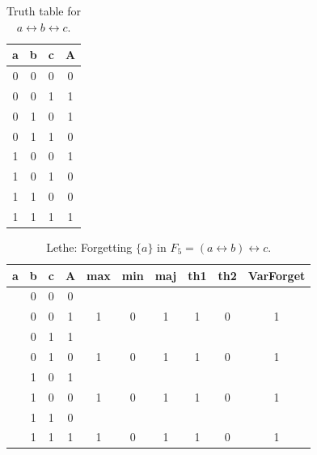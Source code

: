 \begin{table}[!tb]
    \centering
    \begin{tabular}{|c|c|c|c|}
        \hline
        \textbf{a} & \textbf{b} & \textbf{c} & \textbf{A} \\ \hline
        0 & 0 & 0 & 0 \\ \hline
        0 & 0 & 1 & 1 \\ \hline
        0 & 1 & 0 & 1 \\ \hline
        0 & 1 & 1 & 0 \\ \hline
        1 & 0 & 0 & 1 \\ \hline
        1 & 0 & 1 & 0 \\ \hline
        1 & 1 & 0 & 0 \\ \hline
        1 & 1 & 1 & 1 \\ \hline
    \end{tabular}
    \caption{Truth table for $a \leftrightarrow b \leftrightarrow c$.}
    \label{tab:truthtab}
\end{table}

\begin{table}[!tb]
    \centering
    \begin{tabular}{|c|c|c|c|c|c|c|c|c|c|}
        \hline
        \textbf{a} & \textbf{b} & \textbf{c} & \textbf{A} & \textbf{max} & \textbf{min} & \textbf{maj} & \textbf{th1} & \textbf{th2} & \textbf{VarForget} \\ \hline
        \rowcolor{gray!40}  & 0 & 0 & 0 &  &  &  &  &  &  \\ \hline
        \rowcolor{gray!40}  & 0 & 0 & 1 & 1 & 0 & 1 & 1 & 0 & 1 \\ \hline
        \rowcolor{blue!40}  & 0 & 1 & 1 &  &  &  &  &  &  \\ \hline
        \rowcolor{blue!40}  & 0 & 1 & 0 & 1 & 0 & 1 & 1 & 0 & 1 \\ \hline
        \rowcolor{red!40}  & 1 & 0 & 1 &  &  &  &  &  &  \\ \hline
        \rowcolor{red!40}  & 1 & 0 & 0 & 1 & 0 & 1 & 1 & 0 & 1 \\ \hline
        \rowcolor{green!40}  & 1 & 1 & 0 &  &  &  &  &  &  \\ \hline
        \rowcolor{green!40}  & 1 & 1 & 1 & 1 & 0 & 1 & 1 & 0 & 1 \\ \hline
    \end{tabular}
    \caption{Lethe: Forgetting $\{a\}$ in $F_{5} = (a \leftrightarrow b) \leftrightarrow c$.}
    \label{tab:lethe-F5-a}
\end{table}
